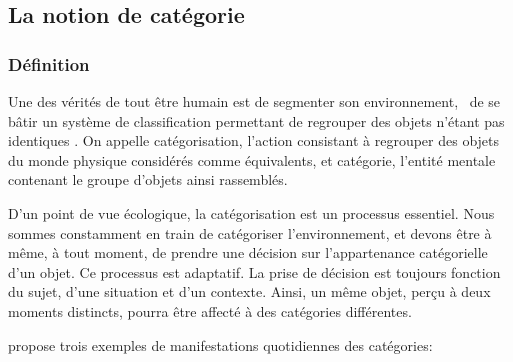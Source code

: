 {\subsection{La notion de catégorie}

\subsubsection{Définition}
\label{sec:ch3_categorieDef}

Une des vérités de tout être humain est de segmenter son environnement, \ie~de se bâtir un système de classification permettant de regrouper des objets n'étant pas identiques \citep[p. 1]{rosch1978cognition}. On appelle catégorisation, l'action consistant à regrouper des objets du monde physique considérés comme équivalents, et catégorie, l'entité mentale contenant le groupe d'objets ainsi rassemblés. 
 
D'un point de vue écologique, la catégorisation est un processus essentiel. Nous sommes constamment en train de catégoriser l'environnement, et devons être à même, à tout moment, de prendre une décision sur l'appartenance catégorielle d'un objet. Ce processus est adaptatif. La prise de décision est toujours fonction du sujet, d'une situation et d'un contexte. Ainsi, un même objet, perçu à deux moments distincts, pourra être affecté à des catégories différentes. 


\citep{anderson1991adaptive} propose trois exemples de manifestations quotidiennes des catégories:

\begin{itemize}


\end{itemize}}
